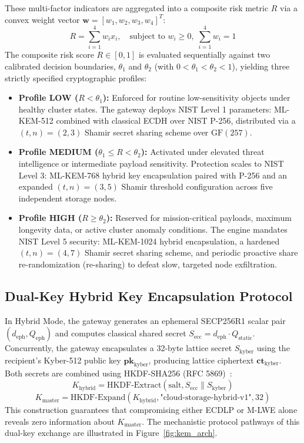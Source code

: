 \documentclass[pdflatex,sn-mathphys,Numbered]{sn-jnl}%
\theoremstyle{thmstyleone}%
\theoremstyle{thmstyletwo}%
\theoremstyle{thmstylethree}%
\begin{document}
These multi-factor indicators are aggregated into a composite risk metric $R$ via a convex weight vector $\mathbf{w} = [w_1, w_2, w_3, w_4]^T$:
\begin{equation}
R = \sum_{i=1}^{4} w_i x_i, \quad \text{subject to } w_i \ge 0, \; \sum_{i=1}^{4} w_i = 1
\label{eq:aede_risk_score}
\end{equation}
The composite risk score $R \in [0, 1]$ is evaluated sequentially against two calibrated decision boundaries, $\theta_1$ and $\theta_2$ (with $0 < \theta_1 < \theta_2 < 1$), yielding three strictly specified cryptographic profiles:
\begin{itemize}
    \item \textbf{Profile LOW ($R < \theta_1$):} Enforced for routine low-sensitivity objects under healthy cluster states. The gateway deploys NIST Level 1 parameters: ML-KEM-512 combined with classical ECDH over NIST P-256, distributed via a $(t, n) = (2, 3)$ Shamir secret sharing scheme over $\text{GF}(257)$.
    \item \textbf{Profile MEDIUM ($\theta_1 \le R < \theta_2$):} Activated under elevated threat intelligence or intermediate payload sensitivity. Protection scales to NIST Level 3: ML-KEM-768 hybrid key encapsulation paired with P-256 and an expanded $(t, n) = (3, 5)$ Shamir threshold configuration across five independent storage nodes.
    \item \textbf{Profile HIGH ($R \ge \theta_2$):} Reserved for mission-critical payloads, maximum longevity data, or active cluster anomaly conditions. The engine mandates NIST Level 5 security: ML-KEM-1024 hybrid encapsulation, a hardened $(t, n) = (4, 7)$ Shamir secret sharing scheme, and periodic proactive share re-randomization (re-sharing) to defeat slow, targeted node exfiltration.
\end{itemize}

\subsection{\textbf{Dual-Key Hybrid Key Encapsulation Protocol}}
In Hybrid Mode, the gateway generates an ephemeral SECP256R1 scalar pair $(d_{\text{eph}}, Q_{\text{eph}})$ and computes classical shared secret $S_{\text{ecc}} = d_{\text{eph}} \cdot Q_{\text{static}}$. Concurrently, the gateway encapsulates a 32-byte lattice secret $S_{\text{kyber}}$ using the recipient's Kyber-512 public key $\mathbf{pk}_{\text{kyber}}$, producing lattice ciphertext $\mathbf{ct}_{\text{kyber}}$. Both secrets are combined using HKDF-SHA256 (RFC 5869)~\cite{krawczyk2010hkdf}:
\begin{equation}
K_{\text{hybrid}} = \text{HKDF-Extract}(\text{salt}, S_{\text{ecc}} \parallel S_{\text{kyber}})
\end{equation}
\begin{equation}
K_{\text{master}} = \text{HKDF-Expand}(K_{\text{hybrid}}, \text{"cloud-storage-hybrid-v1"}, 32)
\end{equation}
This construction guarantees that compromising either ECDLP or M-LWE alone reveals zero information about $K_{\text{master}}$. The mechanistic protocol pathways of this dual-key exchange are illustrated in Figure~\ref{fig:kem_arch}.
\end{document}
